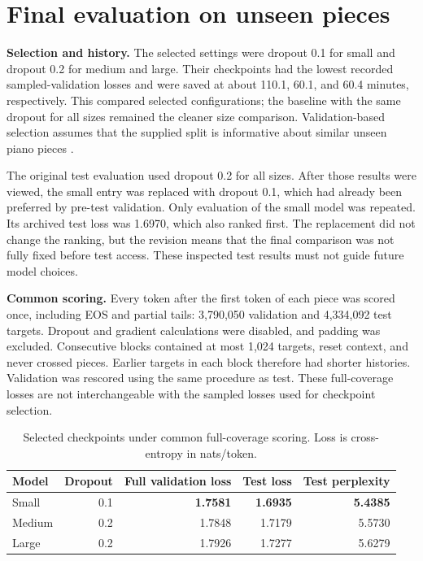 \section{Final evaluation on unseen pieces}
\label{sec:test}
\textbf{Selection and history.} The selected settings were dropout 0.1 for small and dropout 0.2 for medium and large. Their checkpoints had the lowest recorded sampled-validation losses and were saved at about 110.1, 60.1, and 60.4 minutes, respectively. This compared selected configurations; the baseline with the same dropout for all sizes remained the cleaner size comparison. Validation-based selection assumes that the supplied split is informative about similar unseen piano pieces \citep[Section~5.3]{goodfellow2016deep}.

The original test evaluation used dropout 0.2 for all sizes. After those results were viewed, the small entry was replaced with dropout 0.1, which had already been preferred by pre-test validation. Only evaluation of the small model was repeated. Its archived test loss was 1.6970, which also ranked first. The replacement did not change the ranking, but the revision means that the final comparison was not fully fixed before test access. These inspected test results must not guide future model choices.

\textbf{Common scoring.} Every token after the first token of each piece was scored once, including EOS and partial tails: 3,790,050 validation and 4,334,092 test targets. Dropout and gradient calculations were disabled, and padding was excluded. Consecutive blocks contained at most 1,024 targets, reset context, and never crossed pieces. Earlier targets in each block therefore had shorter histories. Validation was rescored using the same procedure as test. These full-coverage losses are not interchangeable with the sampled losses used for checkpoint selection.

\begin{table}[H]
\centering
\caption{Selected checkpoints under common full-coverage scoring. Loss is cross-entropy in nats/token.}
\begin{tabular}{lrrrr}
\toprule Model & Dropout & Full validation loss & Test loss & Test perplexity\\\midrule
Small & 0.1 & \textbf{1.7581} & \textbf{1.6935} & \textbf{5.4385}\\
Medium & 0.2 & 1.7848 & 1.7179 & 5.5730\\
Large & 0.2 & 1.7926 & 1.7277 & 5.6279\\\bottomrule
\end{tabular}
\end{table}

